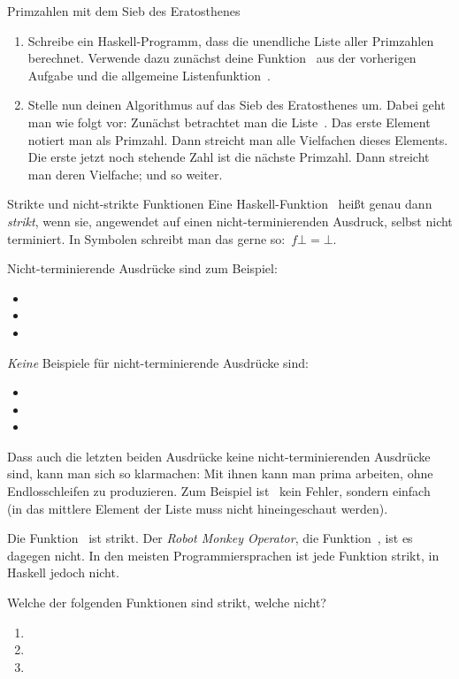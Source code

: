 \documentclass{uebblatt}
\begin{document}
\begin{aufgabe}{Primzahlen mit dem Sieb des Eratosthenes}
\begin{enumerate}
\item Schreibe ein Haskell-Programm, dass die unendliche Liste aller Primzahlen
berechnet. Verwende dazu zunächst deine Funktion~ aus der vorherigen Aufgabe und die allgemeine
Listenfunktion~.
\item Stelle nun deinen Algorithmus auf das Sieb des Eratosthenes um. Dabei
geht man wie folgt vor: Zunächst betrachtet man die
Liste~\haskellinline{[2..]}. Das erste Element notiert man als Primzahl. Dann
streicht man alle Vielfachen dieses Elements. Die erste jetzt noch stehende
Zahl ist die nächste Primzahl. Dann streicht man deren Vielfache; und so
weiter.
\end{enumerate}
\end{aufgabe}

\begin{aufgabe}{Strikte und nicht-strikte Funktionen}
Eine Haskell-Funktion~ heißt genau dann
\emph{strikt}, wenn sie, angewendet auf einen nicht-terminierenden Ausdruck,
selbst nicht terminiert. In Symbolen schreibt man das gerne
so:~$f \bot = \bot$.

Nicht-terminierende Ausdrücke sind zum Beispiel:
\begin{itemize}
\item {}
\item {}
\item {}
\end{itemize}
\emph{Keine} Beispiele für nicht-terminierende Ausdrücke sind:
\begin{itemize}
\item {}
\item \haskellinline{[0..]}
\item \haskellinline{['a', undefined, 'b']}
\end{itemize}
Dass auch die letzten beiden Ausdrücke keine nicht-terminierenden Ausdrücke
sind, kann man sich so klarmachen: Mit ihnen kann man prima arbeiten, ohne
Endlosschleifen zu produzieren. Zum Beispiel ist~ kein Fehler, sondern einfach~ (in das
mittlere Element der Liste muss nicht hineingeschaut werden).

Die Funktion~ ist strikt.
Der \emph{Robot Monkey Operator}, die Funktion~, ist es dagegen nicht. In den meisten Programmiersprachen ist jede
Funktion strikt, in Haskell jedoch nicht.

Welche der folgenden Funktionen sind strikt, welche nicht?
\begin{enumerate}
\item {}
\item {}
\item {}
\end{enumerate}
\end{aufgabe}
\end{document}
